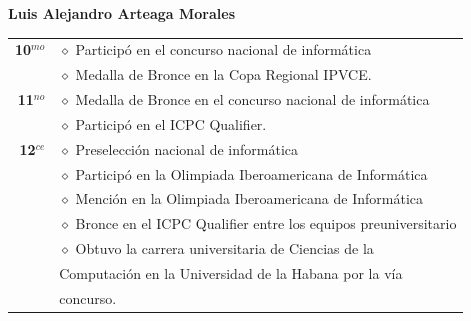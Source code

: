 \begin{minipage}{0.7\textwidth}
	\textbf{Luis Alejandro Arteaga Morales}
	
	\vspace*{0.1in}
	\begin{longtable}{rl}
	
		\textbf{10$^{mo}$} & $\diamond$ Participó en el concurso nacional de informática\\
						   & $\diamond$ Medalla de Bronce en la Copa Regional IPVCE.  \\
		\textbf{11$^{no}$} & $\diamond$ Medalla de Bronce en el concurso nacional de informática \\
		                   & $\diamond$ Participó en el ICPC Qualifier.  \\
		\textbf{12$^{ce}$} & $\diamond$ Preselección nacional de informática  \\
		                   & $\diamond$ Participó en la Olimpiada Iberoamericana de Informática  \\
		                   & $\diamond$ Mención en la Olimpiada Iberoamericana de Informática  \\
		                   & $\diamond$ Bronce en el ICPC Qualifier entre los equipos preuniversitario  \\
		                   & $\diamond$ Obtuvo la carrera universitaria de Ciencias de la \\
		                   & Computación en la Universidad de la Habana por la vía \\
		                   & concurso.
		
	\end{longtable}
	
\end{minipage}

\vspace*{0.2in}

